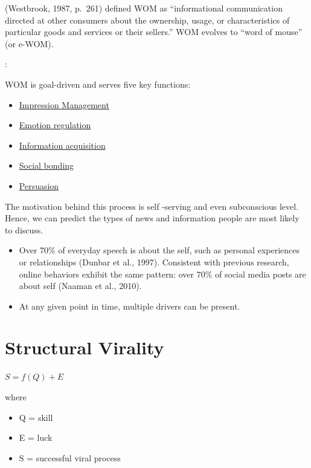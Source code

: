 \documentclass[
]{book}
\providecommand{\tightlist}{%
  \setlength{\itemsep}{0pt}\setlength{\parskip}{0pt}}
\begin{document}
(Westbrook, 1987, p.~261) defined WOM as ``informational communication directed at other consumers about the ownership, usage, or characteristics of particular goods and services or their sellers.'' WOM evolves to ``word of mouse'' (or e-WOM).

\citep{Berger_2014}:

WOM is goal-driven and serves five key functions:

\begin{itemize}
\tightlist
\item
  \protect\hyperlink{impression-management}{Impression Management}
\item
  \protect\hyperlink{emotion-regulation}{Emotion regulation}
\item
  \protect\hyperlink{information-acquisition}{Information acquisition}
\item
  \protect\hyperlink{social-bonding}{Social bonding}
\item
  \protect\hyperlink{persuading-others}{Persuasion}
\end{itemize}

The motivation behind this process is self -serving and even subconscious level. Hence, we can predict the types of news and information people are most likely to discuss.

\begin{itemize}
\tightlist
\item
  Over 70\% of everyday speech is about the self, such as personal experiences or relationships (Dunbar et al., 1997). Consistent with previous research, online behaviors exhibit the same pattern: over 70\% of social media posts are about self (Naaman et al., 2010).
\item
  At any given point in time, multiple drivers can be present.
\end{itemize}

\hypertarget{structural-virality}{%
\section{Structural Virality}\label{structural-virality}}

\citep{Goel_2015}

\(S = f(Q) + E\)

where

\begin{itemize}
\item
  Q = skill
\item
  E = luck
\item
  S = successful viral process
\end{itemize}
\end{document}
